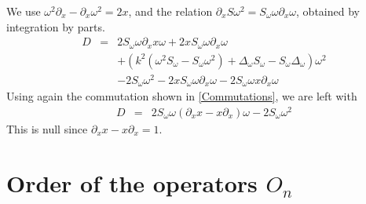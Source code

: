 \documentclass[a4paper]{article}
\begin{document}
	We use $\omega^2 \partial_x - \partial_x \omega^2 = 2x$, and the relation $\partial_x S \omega^2 = S_\omega \omega \partial_x \omega$, obtained by integration by parts. 
	\begin{eqnarray*}
		D &=& 2 S_\omega \omega \partial_x x\omega + 2 x S_\omega  \omega \partial_x \omega \\
		&& + \left(k^2(\omega^2 S_\omega - S_\omega \omega^2) + \Delta_\omega S_\omega - S_\omega \Delta_\omega \right)\omega^2\\
		&& - 2 S_\omega \omega^2 - 2 x  S_\omega \omega \partial_x \omega - 2 S_\omega \omega x \partial_x \omega
	\end{eqnarray*}
	Using again the commutation shown in \autoref{Commutations}, we are left with 
	\begin{eqnarray*}
		D &=&  2 S_\omega \omega (\partial_x x - x \partial_x) \omega - 2 S_\omega \omega^2
	\end{eqnarray*}
	This is null since $\partial_x x - x \partial_x = 1$. 
	
	\section{Order of the operators $O_n$}
	\label{orderOn}
	
\end{document}
